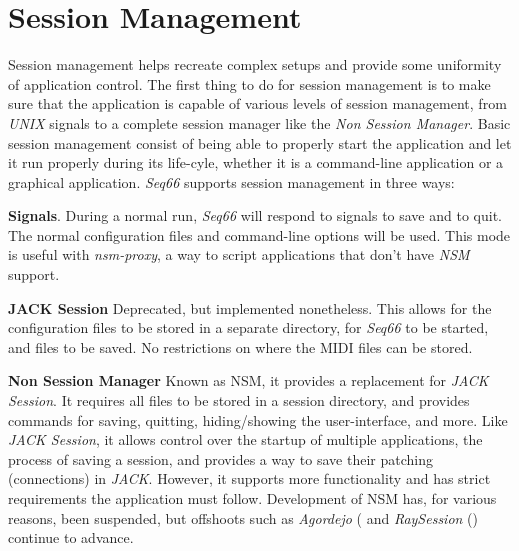 %
%
%

\section{Session Management}
\label{sec:sessions}

   Session management helps recreate complex setups and provide some uniformity
   of application control.
   The first thing to do for session management is to make sure that the
   application is capable of various levels of session management, from
   \textsl{UNIX} signals to
   a complete session manager like the \textsl{Non Session Manager}.
   Basic session management consist of being able to properly start the
   application and let it run properly during its life-cyle, whether it is a
   command-line application or a graphical application.
   \textsl{Seq66} supports session management in three ways:

   \begin{enumber}
      \item \textbf{Signals}.
         During a normal run, \textsl{Seq66} will respond
         to signals to save and to quit.
         The normal configuration files and command-line options will be used.
         This mode is useful with \textsl{nsm-proxy}, a way to script
         applications that don't have \textsl{NSM} support.
      \item \textbf{JACK Session}
         Deprecated, but implemented nonetheless.
         This allows for the configuration files to be stored in
         a separate directory, for \textsl{Seq66} to be started, and files to be
         saved.  No restrictions on where the MIDI files can be stored.
      \item \textbf{Non Session Manager}
         Known as NSM, it provides a replacement for \textsl{JACK Session}.
         It requires all files to be
         stored in a session directory, and provides commands for saving,
         quitting, hiding/showing the user-interface, and more.
         Like \textsl{JACK Session}, it allows control over the startup of
         multiple applications, the process of saving a session, and provides a
         way to save their patching (connections) in \textsl{JACK}.
         However, it supports more functionality and has
         strict requirements the application must follow.
         Development of NSM has, for various reasons, been suspended, but
         offshoots such as \textsl{Agordejo} (\cite{agordejo}
         and \textsl{RaySession} (\cite{raysession})
         continue to advance.
   \end{enumber}

